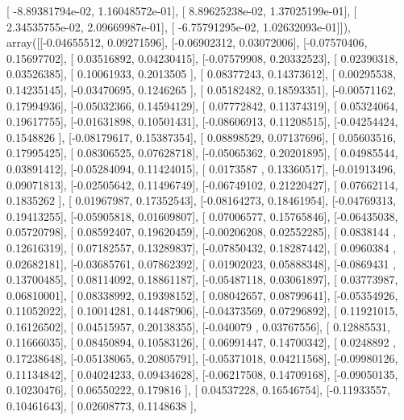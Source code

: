 \documentclass{article}
\begin{document}
       [ -8.89381794e-02,   1.16048572e-01],
       [  8.89625238e-02,   1.37025199e-01],
       [  2.34535755e-02,   2.09669987e-01],
       [ -6.75791295e-02,   1.02632093e-01]]), array([[-0.04655512,  0.09271596],
       [-0.06902312,  0.03072006],
       [-0.07570406,  0.15697702],
       [ 0.03516892,  0.04230415],
       [-0.07579908,  0.20332523],
       [ 0.02390318,  0.03526385],
       [ 0.10061933,  0.2013505 ],
       [ 0.08377243,  0.14373612],
       [ 0.00295538,  0.14235145],
       [-0.03470695,  0.1246265 ],
       [ 0.05182482,  0.18593351],
       [-0.00571162,  0.17994936],
       [-0.05032366,  0.14594129],
       [ 0.07772842,  0.11374319],
       [ 0.05324064,  0.19617755],
       [-0.01631898,  0.10501431],
       [-0.08606913,  0.11208515],
       [-0.04254424,  0.1548826 ],
       [-0.08179617,  0.15387354],
       [ 0.08898529,  0.07137696],
       [ 0.05603516,  0.17995425],
       [ 0.08306525,  0.07628718],
       [-0.05065362,  0.20201895],
       [ 0.04985544,  0.03891412],
       [-0.05284094,  0.11424015],
       [ 0.0173587 ,  0.13360517],
       [-0.01913496,  0.09071813],
       [-0.02505642,  0.11496749],
       [-0.06749102,  0.21220427],
       [ 0.07662114,  0.1835262 ],
       [ 0.01967987,  0.17352543],
       [-0.08164273,  0.18461954],
       [-0.04769313,  0.19413255],
       [-0.05905818,  0.01609807],
       [ 0.07006577,  0.15765846],
       [-0.06435038,  0.05720798],
       [ 0.08592407,  0.19620459],
       [-0.00206208,  0.02552285],
       [ 0.0838144 ,  0.12616319],
       [ 0.07182557,  0.13289837],
       [-0.07850432,  0.18287442],
       [ 0.0960384 ,  0.02682181],
       [-0.03685761,  0.07862392],
       [ 0.01902023,  0.05888348],
       [-0.0869431 ,  0.13700485],
       [ 0.08114092,  0.18861187],
       [-0.05487118,  0.03061897],
       [ 0.03773987,  0.06810001],
       [ 0.08338992,  0.19398152],
       [ 0.08042657,  0.08799641],
       [-0.05354926,  0.11052022],
       [ 0.10014281,  0.14487906],
       [-0.04373569,  0.07296892],
       [ 0.11921015,  0.16126502],
       [ 0.04515957,  0.20138355],
       [-0.040079  ,  0.03767556],
       [ 0.12885531,  0.11666035],
       [ 0.08450894,  0.10583126],
       [ 0.06991447,  0.14700342],
       [ 0.0248892 ,  0.17238648],
       [-0.05138065,  0.20805791],
       [-0.05371018,  0.04211568],
       [-0.09980126,  0.11134842],
       [ 0.04024233,  0.09434628],
       [-0.06217508,  0.14709168],
       [-0.09050135,  0.10230476],
       [ 0.06550222,  0.179816  ],
       [ 0.04537228,  0.16546754],
       [-0.11933557,  0.10461643],
       [ 0.02608773,  0.1148638 ],
\end{document}
